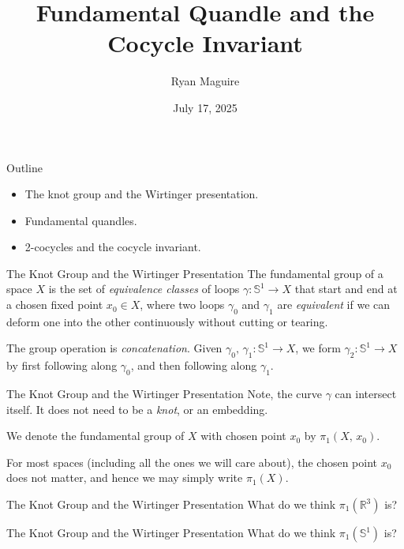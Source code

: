 \documentclass{beamer}
\title{Fundamental Quandle and the Cocycle Invariant}
\author{Ryan Maguire}
\date{July 17, 2025}
\begin{document}
    \maketitle
    \begin{frame}{Outline}
        \begin{itemize}
            \item The knot group and the Wirtinger presentation.
            \item Fundamental quandles.
            \item 2-cocycles and the cocycle invariant.
        \end{itemize}
    \end{frame}
    \begin{frame}{The Knot Group and the Wirtinger Presentation}
        The fundamental group of a space $X$ is the set of
        \textit{equivalence classes} of loops
        $\gamma:\mathbb{S}^{1}\rightarrow{X}$ that start and end at a chosen
        fixed point $x_{0}\in{X}$, where two loops $\gamma_{0}$ and
        $\gamma_{1}$ are \textit{equivalent} if we can deform one into the
        other continuously without cutting or tearing.
        \par\hfill\par
        The group operation is \textit{concatenation}. Given
        $\gamma_{0},\,\gamma_{1}:\mathbb{S}^{1}\rightarrow{X}$, we form
        $\gamma_{2}:\mathbb{S}^{1}\rightarrow{X}$ by first following along
        $\gamma_{0}$, and then following along $\gamma_{1}$.
    \end{frame}
    \begin{frame}{The Knot Group and the Wirtinger Presentation}
        Note, the curve $\gamma$ can intersect itself. It does not need to
        be a \textit{knot}, or an embedding.
        \par\hfill\par
        We denote the fundamental group of $X$ with chosen point $x_{0}$
        by $\pi_{1}(X,\,x_{0})$.
        \par\hfill\par
        For most spaces (including all the ones we will care about),
        the chosen point $x_{0}$ does not matter, and hence we may simply write
        $\pi_{1}(X)$.
    \end{frame}
    \begin{frame}{The Knot Group and the Wirtinger Presentation}
        What do we think $\pi_{1}(\mathbb{R}^{3})$ is?
    \end{frame}
    \begin{frame}{The Knot Group and the Wirtinger Presentation}
        What do we think $\pi_{1}(\mathbb{S}^{1})$ is?
    \end{frame}
\end{document}
